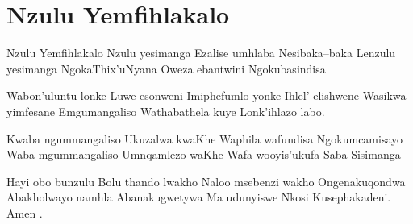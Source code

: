 \starttocol
\chapter{Nzulu Yemfihlakalo}
\nexttocol
\hfill{\it }
\stoptocol
\starttocol
\startlines
{\sc Nzulu} Yemfihlakalo
Nzulu yesimanga
Ezalise umhlaba
Nesibaka--baka
Lenzulu yesimanga
NgokaThix'uNyana
Oweza ebantwini
Ngokubasindisa 

Wabon'uluntu lonke
Luwe esonweni
Imiphefumlo yonke
Ihlel' elishwene
Wasikwa yimfesane
Emgumangaliso
Wathabathela kuye
Lonk'ihlazo labo.

Kwaba ngummangaliso
Ukuzalwa kwaKhe
Waphila wafundisa
Ngokumcamisayo
Waba mgummangaliso
Umnqamlezo waKhe
Wafa wooyis'ukufa
Saba Sisimanga

Hayi obo bunzulu
Bolu thando lwakho
Naloo msebenzi wakho
Ongenakuqondwa
Abakholwayo namhla
Abanakugwetywa
Ma udunyiswe Nkosi
Kusephakadeni.
      \hfill Amen .
\stoplines
\nexttocol

\stoptocol
